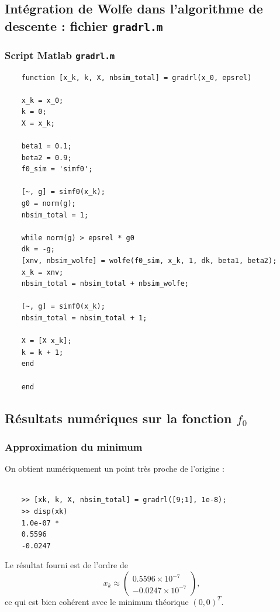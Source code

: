 \documentclass[a4paper,12pt]{article}
\begin{document}
	\subsection{Intégration de Wolfe dans l'algorithme de descente : fichier \texttt{gradrl.m}}
	
	\subsubsection{Script Matlab \texttt{gradrl.m}}
	
	\begin{verbatim}
	function [x_k, k, X, nbsim_total] = gradrl(x_0, epsrel)
	
	x_k = x_0;
	k = 0;
	X = x_k;
	
	beta1 = 0.1;
	beta2 = 0.9;
	f0_sim = 'simf0';
	
	[~, g] = simf0(x_k);
	g0 = norm(g);
	nbsim_total = 1;
	
	while norm(g) > epsrel * g0
	dk = -g;
	[xnv, nbsim_wolfe] = wolfe(f0_sim, x_k, 1, dk, beta1, beta2);
	x_k = xnv;
	nbsim_total = nbsim_total + nbsim_wolfe;
	
	[~, g] = simf0(x_k);
	nbsim_total = nbsim_total + 1;
	
	X = [X x_k];
	k = k + 1;
	end
	
	end
	\end{verbatim}
	
	\subsection{Résultats numériques sur la fonction $f_0$}
	
	\subsubsection{Approximation du minimum}
	
	On obtient numériquement un point très proche de l'origine :
	\begin{verbatim}
	
	>> [xk, k, X, nbsim_total] = gradrl([9;1], 1e-8);
	>> disp(xk)
	1.0e-07 *
	0.5596
	-0.0247
	\end{verbatim}
	
	Le résultat fourni est de l'ordre de
	\begin{equation}
	x_k \approx
	\begin{pmatrix}
	0.5596\times 10^{-7}\\
	-0.0247\times 10^{-7}
	\end{pmatrix},
	\end{equation}
	ce qui est bien cohérent avec le minimum théorique $(0,0)^T$.
	
\end{document}
